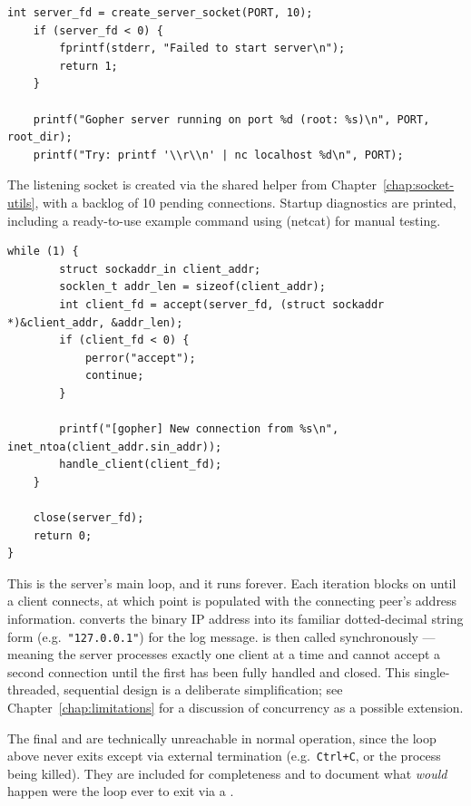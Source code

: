 \begin{lstlisting}[style=cstyle]
    int server_fd = create_server_socket(PORT, 10);
    if (server_fd < 0) {
        fprintf(stderr, "Failed to start server\n");
        return 1;
    }

    printf("Gopher server running on port %d (root: %s)\n", PORT, root_dir);
    printf("Try: printf '\\r\\n' | nc localhost %d\n", PORT);
\end{lstlisting}

The listening socket is created via the shared helper from Chapter~\ref{chap:socket-utils}, with a backlog of 10 pending connections. Startup diagnostics are printed, including a ready-to-use example command using  (netcat) for manual testing.

\begin{lstlisting}[style=cstyle]
    while (1) {
        struct sockaddr_in client_addr;
        socklen_t addr_len = sizeof(client_addr);
        int client_fd = accept(server_fd, (struct sockaddr *)&client_addr, &addr_len);
        if (client_fd < 0) {
            perror("accept");
            continue;
        }

        printf("[gopher] New connection from %s\n", inet_ntoa(client_addr.sin_addr));
        handle_client(client_fd);
    }

    close(server_fd);
    return 0;
}
\end{lstlisting}

This is the server's main loop, and it runs forever. Each iteration blocks on  until a client connects, at which point  is populated with the connecting peer's address information.  converts the binary IP address into its familiar dotted-decimal string form (e.g.\ \texttt{"127.0.0.1"}) for the log message.  is then called synchronously --- meaning the server processes exactly one client at a time and cannot accept a second connection until the first has been fully handled and closed. This single-threaded, sequential design is a deliberate simplification; see Chapter~\ref{chap:limitations} for a discussion of concurrency as a possible extension.

The final  and  are technically unreachable in normal operation, since the  loop above never exits except via external termination (e.g.\ \texttt{Ctrl+C}, or the process being killed). They are included for completeness and to document what \emph{would} happen were the loop ever to exit via a .
